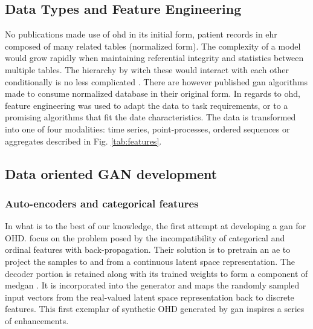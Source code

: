             

    \subsection{Data Types and Feature Engineering}

        No publications made use of \gls{ohd} in its initial form, patient records in \gls{ehr} composed of many related tables (normalized form). The complexity of a model would grow rapidly when maintaining referential integrity and statistics between multiple tables. The hierarchy by witch these would interact with each other conditionally is no less complicated \cite{Buda2015, Patki_2016, Zhang2015, Tay2013}. There are however published \gls{gan} algorithms made to consume normalized database in their original form. \todo In regards to \gls{ohd}, feature engineering was used to adapt the data to task requirements, or to a promising algorithms that fit the date characteristics. The data is transformed into one of four modalities: time series, point-processes, ordered sequences or aggregates described in Fig. \ref{tab:features}.

        

    \subsection{Data oriented GAN development}\label{subsec:data_gan_dev}

        \subsubsection{Auto-encoders and categorical features}\label{subsubsec:categorical}

            In what is to the best of our knowledge, the first attempt at developing a \gls{gan} for OHD. \citeauthor{Choi2017-nt} focus on the problem posed by the incompatibility of categorical and ordinal features with back-propagation. Their solution is to pretrain an \gls{ae} to project the samples to and from a continuous latent space representation. The decoder portion is retained along with its trained weights to form a component of \gls{medgan} \cite{Choi2017-nt}. It is incorporated into the generator and maps the randomly sampled input vectors from the real-valued latent space representation back to discrete features. This first exemplar of synthetic OHD generated by \gls{gan} inspires a series of enhancements.\par

